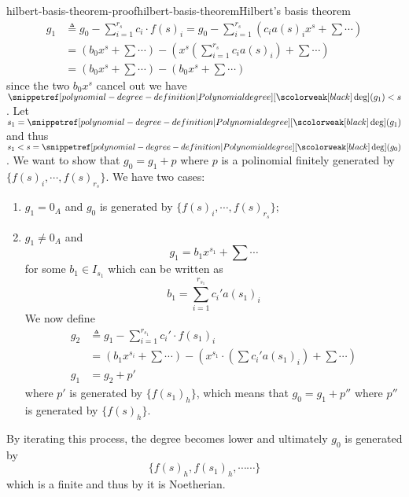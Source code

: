 \documentclass[preview]{standalone}
\begin{document}
\begin{snippetproof}{hilbert-basis-theorem-proof}{hilbert-basis-theorem}{Hilbert's basis theorem}
\begin{align*}
        g_1 &\triangleq g_0 - \sum_{i=1}^{r_s} c_i \cdot f(s)_i
        = g_0 - \sum_{i=1}^{r_s} \left(c_i a(s)_i x^s + \sum \cdots \right) \\
        &= \left(b_0 x^s + \sum \cdots\right) - \left(
            x^s \left(
                \sum_{i=1}^{r_s} c_i a(s)_i
            \right) + \sum \cdots
        \right) \\
        &= \left(b_0 x^s + \sum \cdots\right) - \left(
            b_0 x^s + \sum \cdots
        \right)
    \end{align*}
    since the two \(b_0x^s\) cancel out we have \(\polynomialdeg(g_1) < s\).
    Let \(s_1 = \polynomialdeg(g_1)\) and thus \(s_1 < s = \polynomialdeg(g_0)\).
    We want to show that \(g_0 = g_1 + p\) where \(p\) is a polinomial finitely generated by \(\{f(s)_i, \cdots, f(s)_{r_s}\}\).
    We have two cases:
    \begin{enumerate}
        \item \(g_1 = 0_A\) and \(g_0\) is generated by \(\{f(s)_i, \cdots, f(s)_{r_s}\}\);
        \item \(g_1 \neq 0_A\) and
        \[
            g_1 = b_1 x^{s_1} + \sum \cdots
        \]
        for some \(b_1 \in I_{s_1}\)
        which can be written as \[
            b_1 = \sum_{i=1}^{r_{s_1}} c_i' a(s_1)_i
        \]
        We now define
        \begin{align*}
            g_2 &\triangleq g_1 - \sum_{i=1}^{r_{s_1}} c_i' \cdot f(s_1)_i \\
            &= \left(b_1 x^{s_i} + \sum \cdots\right) - \left(
                x^{s_1} \cdot \left(\sum c_i' a(s_1)_i\right) + \sum \cdots
            \right) \\
            g_1 &= g_2 + p'
        \end{align*}
        where \(p'\) is generated by \(\{f(s_1)_h\}\),
        which means that \(g_0 = g_1 + p''\)
        where \(p''\) is generated by \(\{f(s)_h\}\).
    \end{enumerate}
    By iterating this process, the degree becomes lower and ultimately
    \(g_0\) is generated by 
    \[
        \{
            f(s)_h, f(s_1)_h, \cdots \cdots    
        \}
    \]
    which is a finite \set
    and thus by 
    it is Noetherian.
\end{snippetproof}
\end{document}
